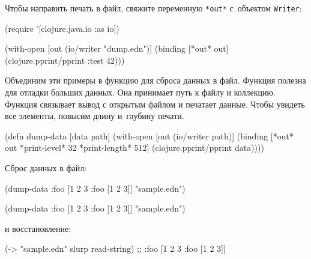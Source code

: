 \fi


Чтобы направить печать в файл, свяжите переменную \verb|*out*| с~объектом
\verb|Writer|:

\begin{english}
  \begin{clojure}
(require '[clojure.java.io :as io])

(with-open [out (io/writer "dump.edn")]
  (binding [*out* out]
    (clojure.pprint/pprint {:test 42})))
  \end{clojure}
\end{english}

Объединим эти примеры в функцию для сброса данных в файл. Функция полезна для
отладки больших данных. Она принимает путь к файлу и коллекцию. Функция
связывает вывод с открытым файлом и печатает данные. Чтобы увидеть все элементы,
повысим длину и~глубину печати.

\begin{english}
  \begin{clojure}
(defn dump-data
  [data path]
  (with-open [out (io/writer path)]
    (binding [*out* out
              *print-level* 32
              *print-length* 512]
      (clojure.pprint/pprint data))))
  \end{clojure}
\end{english}

\noindent
Сброс данных в файл:

\ifnarrow

\begin{english}
  \begin{clojure}
(dump-data
  {:foo [1 2 3 {:foo [1 2 3]}]}
  "sample.edn")
  \end{clojure}
\end{english}

\else

\begin{english}
  \begin{clojure}
(dump-data {:foo [1 2 3 {:foo [1 2 3]}]} "sample.edn")
  \end{clojure}
\end{english}

\fi

\noindent
и восстановление:

\begin{english}
  \begin{clojure}
(-> "sample.edn" slurp read-string)
;; {:foo [1 2 3 {:foo [1 2 3]}]}
  \end{clojure}
\end{english}

